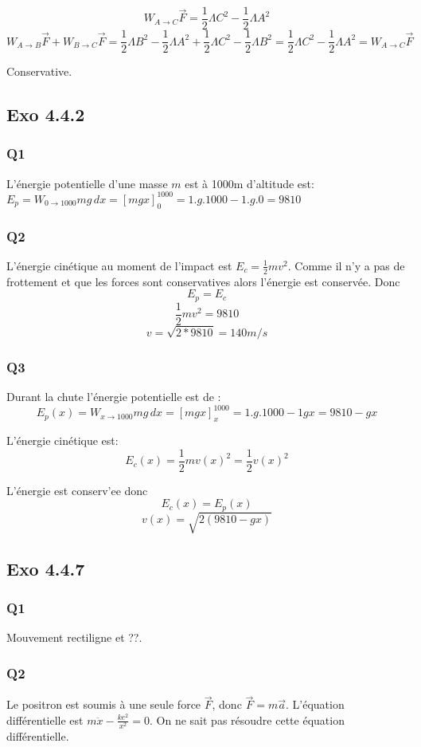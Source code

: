 \documentclass[]{book}
\theoremstyle{definition}
\begin{document}
$$W_{A \to C}\overrightarrow{F} = \frac{1}{2}\Lambda C^2 - \frac{1}{2}\Lambda A^2$$
$$W_{A \to B}\overrightarrow{F} + W_{B \to C}\overrightarrow{F} = \frac{1}{2}\Lambda B^2 - \frac{1}{2}\Lambda A^2 + \frac{1}{2}\Lambda C^2 - \frac{1}{2}\Lambda B^2 = \frac{1}{2}\Lambda C^2 - \frac{1}{2}\Lambda A^2 = W_{A \to C}\overrightarrow{F}$$

Conservative.

\subsection*{Exo 4.4.2}
\subsubsection{Q1}
L'\'energie potentielle d'une masse $m$ est \`a 1000m d'altitude est:
$E_p = W_{0 \to 1000} mg\, dx = [mgx]_0^{1000} = 1.g.1000 - 1.g.0 = 9810$

\subsubsection{Q2}
L'\'energie cin\'etique au moment de l'impact est $E_c = \frac{1}{2}mv^2$. Comme il n'y a pas de frottement et que les forces sont conservatives alors l'\'energie est conserv\'ee. Donc 
$$E_p = E_c$$
$$\frac{1}{2}mv^2 = 9810$$
$$v = \sqrt{2*9810} = 140 m/s$$

\subsubsection{Q3}
Durant la chute l'\'energie potentielle est de :
$$E_p(x) = W_{x \to 1000} mg\, dx = [mgx]_x^{1000} = 1.g.1000 - 1gx = 9810 - gx$$

L'\'energie cin\'etique est:
$$E_c(x) = \frac{1}{2}mv(x)^2 = \frac{1}{2}v(x)^2$$

L'\'energie est conserv'ee donc
$$E_c(x) = E_p(x)$$
$$v(x) = \sqrt{2(9810 - gx)}$$


\subsection*{Exo 4.4.7}
\subsubsection{Q1}
Mouvement rectiligne et ??.

\subsubsection{Q2}
Le positron est soumis \`a une seule force $\overrightarrow{F}$, donc $\overrightarrow{F} = m\overrightarrow{a}$. L'\'equation diff\'erentielle est $m\ddot{x} - \frac{ke^2}{x^2} = 0$. On ne sait pas r\'esoudre cette \'equation diff\'erentielle.
\end{document}
